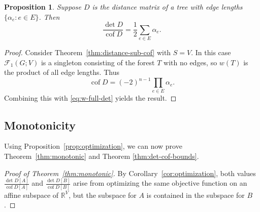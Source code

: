 \documentclass[12pt]{amsart}
\newtheorem{prop}[thm]{Proposition}
\theoremstyle{definition}
\newcommand{\RR}{\mathbb{R}}
\newcommand{\Da}{{D}}
\DeclareMathOperator{\cof}{cof}
\newcommand{\trees}{\mathcal{F}_1}
\begin{document}
\begin{prop}\label{prop:full-det-cof-ratio}
	Suppose $\Da$ is the distance matrix of a tree with edge lengths $\{\alpha_e \colon e \in E\}$.
	Then
	\[
		\frac{\det \Da}{\cof \Da} = \frac1{2} \sum_{e \in E} \alpha_e .
	\]
\end{prop}
\begin{proof}
Consider Theorem~\ref{thm:distance-sub-cof} with $S = V$.
In this case $\trees(G; V)$ is a singleton consisting of the forest $T$ with no edges, so $w({T})$ is the product of all edge lengths.
Thus
\[
	\cof \Da = (-2)^{n - 1} \prod_{e \in E} \alpha_e .
\]
Combining this with \eqref{eq:w-full-det} yields the result.
\end{proof}

\subsection{Monotonicity}


Using Proposition~\ref{prop:optimization}, we can now prove Theorem~\ref{thm:monotonic} and Theorem \ref{thm:det-cof-bounds}.

\begin{proof}[Proof of Theorem~\ref{thm:monotonic}]
By Corollary~\ref{cor:optimization}, both values 
$\displaystyle
	\frac{\det D[A]}{\cof D[A]}
$ 
and
$\displaystyle
	\frac{\det D[B]}{\cof D[B]}
$
arise from optimizing the same objective function on an affine subspace of $\RR^V$, 
but the subspace for $A$ is contained in the subspace for $B$.
\end{proof}
\end{document}
